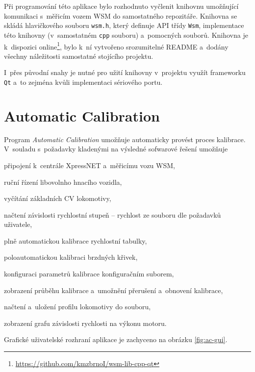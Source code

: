 Při programování této aplikace bylo rozhodnuto vyčlenit knihovnu umožňující
komunikaci s~měřicím vozem WSM do samostatného repozitáře. Knihovna se skládá
hlavičkového souboru \texttt{wsm.h}, který definuje API třídy \texttt{Wsm},
implementace této knihovny (v~samostatném \texttt{cpp} souboru) a~pomocných
souborů. Knihovna je k~dispozici
online\footnote{\url{https://github.com/kmzbrnoI/wsm-lib-cpp-qt}}, bylo k~ní
vytvořeno srozumitelné README a~dodány všechny náležitosti samostatné stojícího
projektu.

I~přes původní snahy je nutné pro užití knihovny v~projektu využít frameworku
\texttt{Qt} a~to zejména kvůli implementaci sériového portu.


\newpage
\section{Automatic Calibration}
\label{sec:sw-wsm-auto-calib}

Program \textit{Automatic Calibration} umožňuje automaticky provést proces
kalibrace. V~souladu s~požadavky kladenými na výsledné sofwarové řešení
umožňuje

\begin{compactitem}
\item připojení k~centrále XpressNET a~měřicímu vozu WSM,
\item ruční řízení libovolnho hnacího vozidla,
\item vyčítání základních CV lokomotivy,
\item načtení závislosti rychlostní stupeň -- rychlost ze souboru dle požadavků
uživatele,
\item plně automatickou kalibrace rychlostní tabulky,
\item poloautomatickou kalibraci brzdných křivek,
\item konfiguraci parametrů kalibrace konfiguračním suborem,
\item zobrazení průběhu kalibrace a~umožnění přerušení a~obnovení kalibrace,
\item načtení a~uložení profilu lokomotivy do souboru,
\item zobrazení grafu závislosti rychlosti na výkonu motoru.
\end{compactitem}

Grafické uživatelské rozhraní aplikace je zachyceno na obrázku \ref{fig:ac-gui}.

